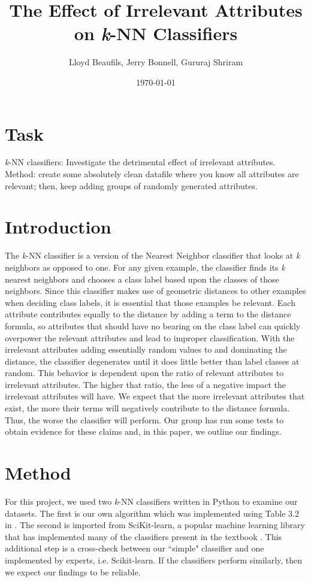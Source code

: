 \documentclass{article}
\title{%
       The Effect of Irrelevant Attributes on \textit{\textit{k}}-NN Classifiers}
\author{Lloyd Beaufils, Jerry Bonnell, Gururaj Shriram}
\date{\today}
\begin{document}
\maketitle

\section{Task}

\textit{\textit{k}}-NN classifiers: Investigate the detrimental effect of irrelevant attributes. Method: create some absolutely clean datafile where you know all attributes are relevant; then, keep adding groups of randomly generated attributes.

\section{Introduction}

The \textit{\textit{k}}-NN classifier is a version of the Nearest Neighbor classifier that looks at \textit{\textit{k}} neighbors as opposed to one. For any given example, the classifier finds its \textit{\textit{k}} nearest neighbors and chooses a class label based upon the classes of those neighbors. Since this classifier makes use of geometric distances to other examples when deciding class labels, it is essential that those examples be relevant. Each attribute contributes equally to the distance by adding a term to the distance formula, so attributes that should have no bearing on the class label can quickly overpower the relevant attributes and lead to improper classification. With the irrelevant attributes adding essentially random values to and dominating the distance, the classifier degenerates until it does little better than label classes at random. This behavior is dependent upon the ratio of relevant attributes to irrelevant attributes. The higher that ratio, the less of a negative impact the irrelevant attributes will have. We expect that the more irrelevant attributes that exist, the more their terms will negatively contribute to the distance formula. Thus, the worse the classifier will perform. Our group has run some tests to obtain evidence for these claims and, in this paper, we outline our findings.

\section{Method}

For this project, we used two \textit{k}-NN classifiers written in Python to examine our datasets. The first is our own algorithm which was implemented using Table 3.2 in \cite{kubat}. The second is imported from SciKit-learn, a popular machine learning library that has implemented many of the classifiers present in the textbook \cite{scikit}. This additional step is a cross-check between our ``simple" classifier and one implemented by experts, i.e. Scikit-learn. If the classifiers perform similarly, then we expect our findings to be reliable.  \\  
\end{document}
